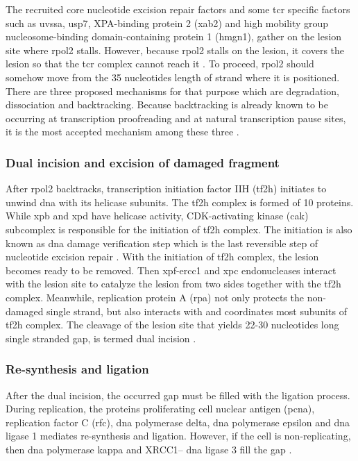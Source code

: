The recruited core nucleotide excision repair factors and some \gls{tcr} specific factors such as \gls{uvssa}, \gls{usp7}, XPA-binding protein 2 (\gls{xab2}) and high mobility group nucleosome-binding domain-containing protein 1 (\gls{hmgn1}), gather on the lesion site where \gls{rpol2} stalls. However, because \gls{rpol2} stalls on the lesion, it covers the lesion so that the \gls{tcr} complex cannot reach it \citep{tornaletti1999structural}. To proceed, \gls{rpol2} should somehow move from the 35 nucleotides length of strand where it is positioned. There are three proposed mechanisms for that purpose which are degradation, dissociation and backtracking. Because backtracking is already known to be occurring at transcription proofreading and at natural transcription pause sites, it is the most accepted mechanism among these three \citep{marteijn2014understanding}. 

\subsubsection{Dual incision and excision of damaged fragment}

After \gls{rpol2} backtracks, transcription initiation factor IIH (\gls{tf2h}) initiates to unwind \gls{dna} with its helicase subunits. The \gls{tf2h} complex is formed of 10 proteins. While \gls{xpb} and \gls{xpd} have helicase activity, CDK-activating kinase (\gls{cak}) subcomplex is responsible for the initiation of \gls{tf2h} complex. The initiation is also known as \gls{dna} damage verification step which is the last reversible step of nucleotide excision repair \citep{marteijn2014understanding}. With the initiation of \gls{tf2h} complex, the lesion becomes ready to be removed. Then \gls{xpf}-\gls{ercc1} and \gls{xpc} endonucleases interact with the lesion site to catalyze the lesion from two sides together with the \gls{tf2h} complex. Meanwhile, replication protein A (\gls{rpa}) not only protects the non-damaged single strand, but also interacts with and coordinates most subunits of \gls{tf2h} complex. The cleavage of the lesion site that yields 22-30 nucleotides long single stranded gap, is termed dual incision \citep{marteijn2014understanding}.

\subsubsection{Re-synthesis and ligation}

After the dual incision, the occurred gap must be filled with the ligation process. During replication, the proteins proliferating cell nuclear antigen (\gls{pcna}), replication factor C (\gls{rfc}), \gls{dna} polymerase \gls{delta}, \gls{dna} polymerase \gls{epsilon} and \gls{dna} ligase 1 mediates re-synthesis and ligation. However, if the cell is non-replicating, then \gls{dna} polymerase \gls{kappa} and XRCC1– \gls{dna} ligase 3 fill the gap \citep{marteijn2014understanding}.

